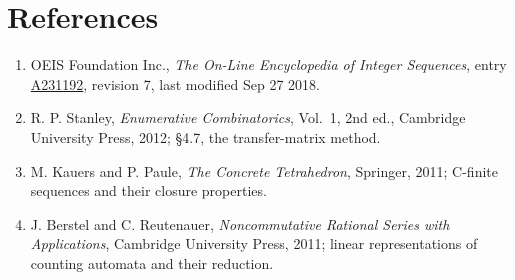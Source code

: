\documentclass[11pt]{article}
\theoremstyle{definition}
\begin{document}
\section{References}

\begin{enumerate}

\item OEIS Foundation Inc., \emph{The On-Line Encyclopedia of Integer Sequences}, entry \href{https://oeis.org/A231192}{A231192}, revision 7, last modified Sep 27 2018.

\item R. P. Stanley, \emph{Enumerative Combinatorics}, Vol.~1, 2nd ed., Cambridge University Press, 2012; \S4.7, the transfer-matrix method.

\item M. Kauers and P. Paule, \emph{The Concrete Tetrahedron}, Springer, 2011; C-finite sequences and their closure properties.

\item J. Berstel and C. Reutenauer, \emph{Noncommutative Rational Series with Applications}, Cambridge University Press, 2011; linear representations of counting automata and their reduction.

\end{enumerate}
\end{document}
